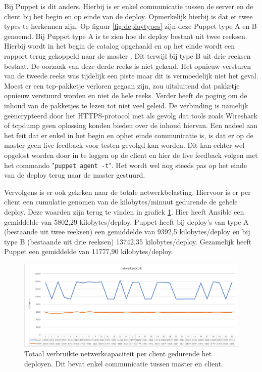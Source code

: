 Bij Puppet is dit anders. Hierbij is er enkel communicatie tussen de server en de client bij het begin en op einde van de deploy.  Opmerkelijk hierbij is dat er twee types te herkennen zijn. Op figuur \ref{fig:deploytypes} zijn deze Puppet type A en B genoemd. Bij Puppet type A is te zien hoe de deploy bestaat uit twee reeksen. Hierbij wordt in het begin de \gls{catalog} opgehaald en op het einde wordt een rapport terug gekoppeld naar de master \autocite{puppetarchitecture}. Dit terwijl bij type B uit drie reeksen bestaat. De oorzaak van deze derde reeks is niet gekend. Het opnieuw versturen van de tweede reeks was tijdelijk een piste maar dit is vermoedelijk niet het geval. Moest er een tcp-pakketje verloren gegaan zijn, zou uitsluitend dat pakketje opnieuw verstuurd worden en niet de hele reeks. Verder heeft de poging om de inhoud van de pakketjes te lezen tot niet veel geleid. De verbinding is namelijk ge\"encrypteerd door het HTTPS-protocol met als gevolg dat tools zoals Wireshark of tcpdump geen oplossing konden bieden over de inhoud hiervan.\newline
Een nadeel aan het feit dat er enkel in het begin en ophet einde communicatie is, is dat er op de master geen live feedback voor testen gevolgd kan worden. Dit kan echter wel opgelost worden door in te loggen op de client en hier de live feedback volgen met het commando "\texttt{puppet agent -t}". Het wordt wel nog steeds pas op het einde van de deploy terug naar de master gestuurd.
 \newline


Vervolgens is er ook gekeken naar de totale netwerkbelasting. Hiervoor is er per client een cumulatie genomen van de kilobytes/minuut gedurende de gehele deploy. Deze waarden zijn terug te vinden in grafiek \ref{fig:netwerkverbruik}. Hier heeft Ansible een gemiddelde van 5802,29 kilobytes/deploy. Puppet heeft bij deploy's van type A (bestaande uit twee reeksen) een gemiddelde van  9392,5 kilobytes/deploy en bij type B (bestaande uit drie reeksen) 13742,35 kilobytes/deploy. Gezamelijk heeft Puppet een gemiddelde van 11777,90 kilobytes/deploy. 


\begin{figure}
  \includegraphics[width=\linewidth]{img/netwerkverbruik.png}
 \caption{Totaal verbruikte netwerkcapaciteit per client gedurende het deployen. Dit bevat enkel communicatie tussen master en client.}  
  \label{fig:netwerkverbruik}
\end{figure}


